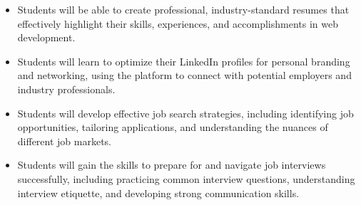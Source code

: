 \begin{itemize}
    \item Students will be able to create professional, industry-standard resumes that effectively highlight their skills, experiences, and accomplishments in web development.
    \item Students will learn to optimize their LinkedIn profiles for personal branding and networking, using the platform to connect with potential employers and industry professionals.
    \item Students will develop effective job search strategies, including identifying job opportunities, tailoring applications, and understanding the nuances of different job markets.
    \item Students will gain the skills to prepare for and navigate job interviews successfully, including practicing common interview questions, understanding interview etiquette, and developing strong communication skills.
\end{itemize}
